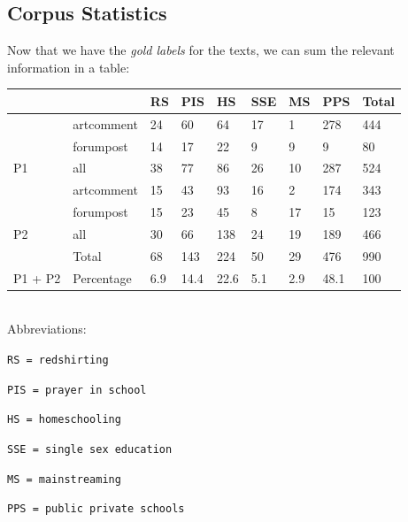 \subsection{Corpus Statistics}
Now that we have the \emph{gold labels} for the texts, we can sum the relevant information in a table: 
\begin{table}[H]
\centering
\begin{tabular}{ll|l|l|l|l|l|l|l|}
\cline{3-9}
 &  & RS & PIS & HS & SSE & MS & PPS & Total \\ \hline
\multicolumn{1}{|l|}{} & artcomment & 24 & 60 & 64 & 17 & 1 & 278 & 444 \\ \cline{2-9} 
\multicolumn{1}{|l|}{} & forumpost & 14 & 17 & 22 & 9 & 9 & 9 & 80 \\ \cline{2-9} 
\multicolumn{1}{|l|}{\multirow{-3}{*}{P1}} & \cellcolor[HTML]{C0C0C0}all & \cellcolor[HTML]{C0C0C0}38 & \cellcolor[HTML]{C0C0C0}77 & \cellcolor[HTML]{C0C0C0}86 & \cellcolor[HTML]{C0C0C0}26 & \cellcolor[HTML]{C0C0C0}10 & \cellcolor[HTML]{C0C0C0}287 & \cellcolor[HTML]{C0C0C0}524 \\ \hline
\multicolumn{1}{|l|}{} & artcomment & 15 & 43 & 93 & 16 & 2 & 174 & 343 \\ \cline{2-9} 
\multicolumn{1}{|l|}{} & forumpost & 15 & 23 & 45 & 8 & 17 & 15 & 123 \\ \cline{2-9} 
\multicolumn{1}{|l|}{\multirow{-3}{*}{P2}} & \cellcolor[HTML]{C0C0C0}all & \cellcolor[HTML]{C0C0C0}30 & \cellcolor[HTML]{C0C0C0}66 & \cellcolor[HTML]{C0C0C0}138 & \cellcolor[HTML]{C0C0C0}24 & \cellcolor[HTML]{C0C0C0}19 & \cellcolor[HTML]{C0C0C0}189 & \cellcolor[HTML]{C0C0C0}466 \\ \hline
\multicolumn{1}{|l|}{} & Total & 68 & 143 & 224 & 50 & 29 & 476 & 990 \\ \cline{2-9} 
\multicolumn{1}{|l|}{\multirow{-2}{*}{P1  + P2}} & Percentage & 6.9 & 14.4 & 22.6 & 5.1 & 2.9 & 48.1 & 100 \\ \hline
\end{tabular}
\end{table}
\\
Abbreviations:

\texttt{RS = redshirting}

\texttt{PIS = prayer in school}

\texttt{HS = homeschooling}

\texttt{SSE = single sex education}

\texttt{MS = mainstreaming}

\texttt{PPS = public private schools}

